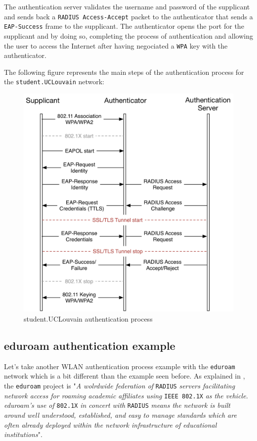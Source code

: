 The authentication server validates the username and password of the supplicant and sends back a \texttt{RADIUS Access-Accept} packet to the authenticator that sends a \texttt{EAP-Success} frame to the supplicant. The authenticator opens the port for the supplicant and by doing so, completing the process of authentication and allowing the user to access the Internet after having negociated a \texttt{WPA} key with the authenticator.

The following figure represents the main steps of the authentication process for the \texttt{student.UCLouvain} network:

\begin{figure}[H]
	\includegraphics[width=.9\linewidth]{Pictures/Chapter2/student.png}
	\caption{student.UCLouvain authentication process}
\end{figure}


\subsection{eduroam authentication example}
Let's take another WLAN authentication process example with the \texttt{eduroam} network which is a bit different than the example seen before.
As explained in \cite{eduroamRadius}, the \texttt{eduroam} project is "\textit{A wolrdwide federation of} \texttt{RADIUS} \textit{ servers facilitating network access for roaming academic affiliates using} \texttt{IEEE 802.1X} \textit{as the vehicle. eduroam's use of} \texttt{802.1X} \textit{in concert with} \texttt{RADIUS} \textit{means the network is built around well understood, established, and easy to manage standards which are often already deployed within the network infrastructure of educational institutions}".

